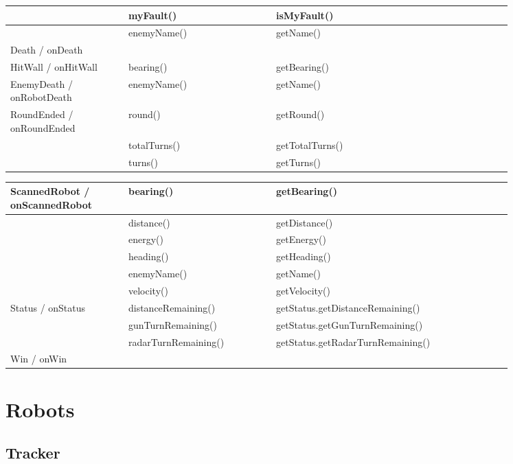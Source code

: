 \begin{center}
\begin{tabular}{ | p{0.2\linewidth} | p{0.25\linewidth} | p{0.4\linewidth} |}
		& myFault() & isMyFault() \\ \hline
		& enemyName() & getName() \\ \hline
		Death / onDeath & & \\ \hline
		HitWall / onHitWall & bearing() & getBearing() \\ \hline
		EnemyDeath / onRobotDeath & enemyName() & getName() \\ \hline
		RoundEnded / onRoundEnded & round() & getRound() \\ \hline
		& totalTurns() & getTotalTurns() \\ \hline
		& turns() & getTurns() \\ \hline
	\end{tabular}
\end{center}		
\begin{center}
	\begin{tabular}{ | p{0.2\linewidth} | p{0.25\linewidth} | p{0.4\linewidth} |}
		\hline		
		ScannedRobot / onScannedRobot & bearing() & getBearing() \\ \hline
		& distance() & getDistance() \\ \hline
		& energy() & getEnergy() \\ \hline
		& heading() & getHeading() \\ \hline
		& enemyName() & getName() \\ \hline
		& velocity() & getVelocity() \\ \hline
		Status / onStatus & distanceRemaining() & getStatus.getDistanceRemaining() \\ \hline
		& gunTurnRemaining() & getStatus.getGunTurnRemaining() \\ \hline
		& radarTurnRemaining() & getStatus.getRadarTurnRemaining() \\ \hline
		Win / onWin &  & \\
		\hline
	\end{tabular}
\end{center}

\section{Robots}
\subsection{Tracker}

